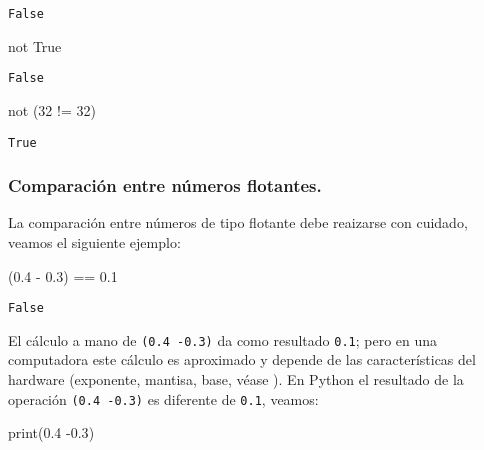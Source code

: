 \documentclass[
  letterpaper,
  DIV=11,
  numbers=noendperiod]{scrreprt}
\newenvironment{Shaded}{\begin{snugshade}}{\end{snugshade}}
\newcommand{\BuiltInTok}[1]{\textcolor[rgb]{0.00,0.23,0.31}{#1}}
\newcommand{\DecValTok}[1]{\textcolor[rgb]{0.68,0.00,0.00}{#1}}
\newcommand{\FloatTok}[1]{\textcolor[rgb]{0.68,0.00,0.00}{#1}}
\newcommand{\KeywordTok}[1]{\textcolor[rgb]{0.00,0.23,0.31}{#1}}
\newcommand{\NormalTok}[1]{\textcolor[rgb]{0.00,0.23,0.31}{#1}}
\newcommand{\OperatorTok}[1]{\textcolor[rgb]{0.37,0.37,0.37}{#1}}
\newcommand{\VariableTok}[1]{\textcolor[rgb]{0.07,0.07,0.07}{#1}}
\begin{document}
\begin{verbatim}
False
\end{verbatim}

\begin{Shaded}
\begin{Highlighting}[]
\KeywordTok{not} \VariableTok{True}
\end{Highlighting}
\end{Shaded}

\begin{verbatim}
False
\end{verbatim}

\begin{Shaded}
\begin{Highlighting}[]
\KeywordTok{not}\NormalTok{ (}\DecValTok{32} \OperatorTok{!=} \DecValTok{32}\NormalTok{)}
\end{Highlighting}
\end{Shaded}

\begin{verbatim}
True
\end{verbatim}

\subsubsection{Comparación entre números
flotantes.}\label{comparaciuxf3n-entre-nuxfameros-flotantes.}

La comparación entre números de tipo flotante debe reaizarse con
cuidado, veamos el siguiente ejemplo:

\begin{Shaded}
\begin{Highlighting}[]
\NormalTok{(}\FloatTok{0.4} \OperatorTok{{-}} \FloatTok{0.3}\NormalTok{) }\OperatorTok{==} \FloatTok{0.1}
\end{Highlighting}
\end{Shaded}

\begin{verbatim}
False
\end{verbatim}

El cálculo a mano de \texttt{(0.4\ -0.3)} da como resultado
\texttt{0.1}; pero en una computadora este cálculo es aproximado y
depende de las características del hardware (exponente, mantisa, base,
véase ). En Python el resultado de la operación \texttt{(0.4\ -0.3)} es
diferente de \texttt{0.1}, veamos:

\begin{Shaded}
\begin{Highlighting}[]
\BuiltInTok{print}\NormalTok{(}\FloatTok{0.4} \OperatorTok{{-}}\FloatTok{0.3}\NormalTok{)}
\end{Highlighting}
\end{Shaded}
\end{document}
